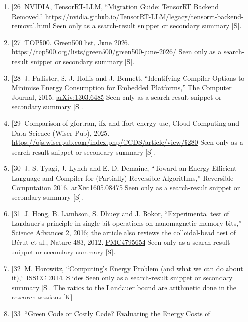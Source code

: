 \documentclass[10pt,letterpaper]{article}
\begin{document}
\begin{enumerate}
  2009. \href{https://arxiv.org/abs/1004.5534}{arXiv:1004.5534} Seen
  only as a search-result snippet or secondary summary {[}S{]}.
\item
  {[}26{]} NVIDIA, TensorRT-LLM, ``Migration Guide: TensorRT Backend
  Removed.''
  \url{https://nvidia.github.io/TensorRT-LLM/legacy/tensorrt-backend-removal.html}
  Seen only as a search-result snippet or secondary summary {[}S{]}.
\item
  {[}27{]} TOP500, Green500 list, June 2026.
  \url{https://top500.org/lists/green500/green500-june-2026/} Seen only
  as a search-result snippet or secondary summary {[}S{]}.
\item
  {[}28{]} J. Pallister, S. J. Hollis and J. Bennett, ``Identifying
  Compiler Options to Minimise Energy Consumption for Embedded
  Platforms,'' The Computer Journal, 2015.
  \href{https://arxiv.org/pdf/1303.6485}{arXiv:1303.6485} Seen only as a
  search-result snippet or secondary summary {[}S{]}.
\item
  {[}29{]} Comparison of gfortran, ifx and ifort energy use, Cloud
  Computing and Data Science (Wiser Pub), 2025.
  \url{https://ojs.wiserpub.com/index.php/CCDS/article/view/6280} Seen
  only as a search-result snippet or secondary summary {[}S{]}.
\item
  {[}30{]} J. S. Tyagi, J. Lynch and E. D. Demaine, ``Toward an Energy
  Efficient Language and Compiler for (Partially) Reversible
  Algorithms,'' Reversible Computation 2016.
  \href{https://arxiv.org/pdf/1605.08475}{arXiv:1605.08475} Seen only as
  a search-result snippet or secondary summary {[}S{]}.
\item
  {[}31{]} J. Hong, B. Lambson, S. Dhuey and J. Bokor, ``Experimental
  test of Landauer's principle in single-bit operations on nanomagnetic
  memory bits,'' Science Advances 2, 2016; the article also reviews the
  colloidal-bead test of Bérut et al., Nature 483, 2012.
  \href{https://pmc.ncbi.nlm.nih.gov/articles/PMC4795654}{PMC4795654}
  Seen only as a search-result snippet or secondary summary {[}S{]}.
\item
  {[}32{]} M. Horowitz, ``Computing's Energy Problem (and what we can do
  about it),'' ISSCC 2014.
  \href{https://pages.cs.wisc.edu/~markhill/restricted/isscc2014_horowitz_power_scaling.pdf}{Slides}
  Seen only as a search-result snippet or secondary summary {[}S{]}. The
  ratios to the Landauer bound are arithmetic done in the research
  sessions {[}K{]}.
\item
  {[}33{]} ``Green Code or Costly Code? Evaluating the Energy Costs of

\end{enumerate}
\end{document}
